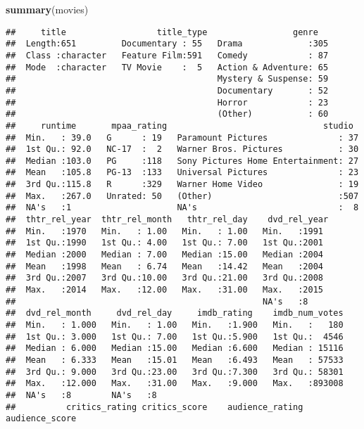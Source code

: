 \documentclass[]{article}
\newenvironment{Shaded}{\begin{snugshade}}{\end{snugshade}}
\newcommand{\KeywordTok}[1]{\textcolor[rgb]{0.13,0.29,0.53}{\textbf{#1}}}
\newcommand{\NormalTok}[1]{#1}
\begin{document}
\begin{Shaded}
\begin{Highlighting}[]
\KeywordTok{summary}\NormalTok{(movies)}
\end{Highlighting}
\end{Shaded}

\begin{verbatim}
##     title                  title_type                 genre    
##  Length:651         Documentary : 55   Drama             :305  
##  Class :character   Feature Film:591   Comedy            : 87  
##  Mode  :character   TV Movie    :  5   Action & Adventure: 65  
##                                        Mystery & Suspense: 59  
##                                        Documentary       : 52  
##                                        Horror            : 23  
##                                        (Other)           : 60  
##     runtime       mpaa_rating                               studio   
##  Min.   : 39.0   G      : 19   Paramount Pictures              : 37  
##  1st Qu.: 92.0   NC-17  :  2   Warner Bros. Pictures           : 30  
##  Median :103.0   PG     :118   Sony Pictures Home Entertainment: 27  
##  Mean   :105.8   PG-13  :133   Universal Pictures              : 23  
##  3rd Qu.:115.8   R      :329   Warner Home Video               : 19  
##  Max.   :267.0   Unrated: 50   (Other)                         :507  
##  NA's   :1                     NA's                            :  8  
##  thtr_rel_year  thtr_rel_month   thtr_rel_day    dvd_rel_year 
##  Min.   :1970   Min.   : 1.00   Min.   : 1.00   Min.   :1991  
##  1st Qu.:1990   1st Qu.: 4.00   1st Qu.: 7.00   1st Qu.:2001  
##  Median :2000   Median : 7.00   Median :15.00   Median :2004  
##  Mean   :1998   Mean   : 6.74   Mean   :14.42   Mean   :2004  
##  3rd Qu.:2007   3rd Qu.:10.00   3rd Qu.:21.00   3rd Qu.:2008  
##  Max.   :2014   Max.   :12.00   Max.   :31.00   Max.   :2015  
##                                                 NA's   :8     
##  dvd_rel_month     dvd_rel_day     imdb_rating    imdb_num_votes  
##  Min.   : 1.000   Min.   : 1.00   Min.   :1.900   Min.   :   180  
##  1st Qu.: 3.000   1st Qu.: 7.00   1st Qu.:5.900   1st Qu.:  4546  
##  Median : 6.000   Median :15.00   Median :6.600   Median : 15116  
##  Mean   : 6.333   Mean   :15.01   Mean   :6.493   Mean   : 57533  
##  3rd Qu.: 9.000   3rd Qu.:23.00   3rd Qu.:7.300   3rd Qu.: 58301  
##  Max.   :12.000   Max.   :31.00   Max.   :9.000   Max.   :893008  
##  NA's   :8        NA's   :8                                       
##          critics_rating critics_score    audience_rating audience_score 

\end{verbatim}
\end{document}

